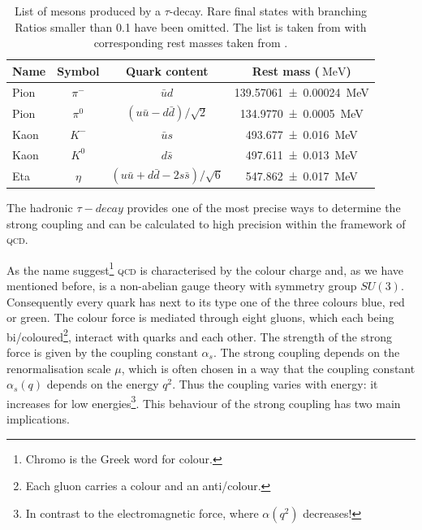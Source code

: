 \documentclass[../../index.tex]{subfiles}
\begin{document}
\begin{table}
  \centering
  \begin{tabular}{l c c c}
    \toprule
    Name & Symbol & Quark content & Rest mass ($\SI{}{\mega\electronvolt}$) \\
    \midrule
    Pion & $\pi^-$ & $\bar u d$ & \SI{139.57061 \pm 0.00024}{\mega\electronvolt}  \\
    Pion & $\pi^0$ & $(u \bar u - d \bar d)/\sqrt{2}$ & \SI{134.9770\pm0.0005}{\mega\electronvolt} \\
    Kaon & $K^-$ & $\bar u s$ & \SI{493.677\pm0.016}{\mega\electronvolt} \\
    Kaon & $K^0$ & $d \bar s$ & \SI{497.611\pm0.013}{\mega\electronvolt} \\
    Eta & $\eta$ & $(u \bar u + d \bar d - 2 s \bar s)/\sqrt{6}$ & \SI{547.862\pm0.017}{\mega\electronvolt} \\
  \end{tabular}
  \caption{List of mesons produced by a $\tau$-decay. Rare final states with
    branching Ratios smaller than 0.1 have been omitted. The list is taken from
    \cite{Davier2006} with corresponding rest masses taken from \cite{PDG2018}.}
  \label{table:lightMesons}
\end{table}
The hadronic $\tau-decay$ provides one of the most precise ways to determine the
strong coupling \cite{Pich2016} and can be calculated to high precision within
the framework of \textsc{qcd}.

As the name suggest\footnote{Chromo is the Greek word for colour.} \textsc{qcd}
is characterised by the colour charge and, as we have mentioned before, is a
non-abelian gauge theory with symmetry group $SU(3)$. Consequently every quark
has next to its type one of the three colours blue, red or green. The colour
force is mediated through eight gluons, which each being
bi\-/coloured\footnote{Each gluon carries a colour and an anti\-/colour.},
interact with quarks and each other. The strength of the strong force is given
by the coupling constant $\alpha_s$. The strong coupling depends on the
renormalisation scale $\mu$, which is often chosen in a way that the coupling
constant $\alpha_s(q)$ depends on the energy $q^2$. Thus the coupling varies
with energy: it increases for low energies\footnote{In contrast to the
  electromagnetic force, where $\alpha(q^2)$ decreases!}. This behaviour of the
strong coupling has two main implications.
\end{document}
